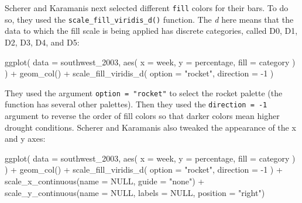 \documentclass[
]{book}
\newenvironment{Shaded}{\begin{snugshade}}{\end{snugshade}}
\newcommand{\AttributeTok}[1]{\textcolor[rgb]{0.77,0.63,0.00}{#1}}
\newcommand{\ConstantTok}[1]{\textcolor[rgb]{0.00,0.00,0.00}{#1}}
\newcommand{\DecValTok}[1]{\textcolor[rgb]{0.00,0.00,0.81}{#1}}
\newcommand{\FunctionTok}[1]{\textcolor[rgb]{0.00,0.00,0.00}{#1}}
\newcommand{\NormalTok}[1]{#1}
\newcommand{\SpecialCharTok}[1]{\textcolor[rgb]{0.00,0.00,0.00}{#1}}
\newcommand{\StringTok}[1]{\textcolor[rgb]{0.31,0.60,0.02}{#1}}
\begin{document}
Scherer and Karamanis next selected different \texttt{fill} colors for their bars. To do so, they used the \texttt{scale\_fill\_viridis\_d()} function. The \emph{d} here means that the data to which the fill scale is being applied has discrete categories, called D0, D1, D2, D3, D4, and D5:

\begin{Shaded}
\begin{Highlighting}[]
\FunctionTok{ggplot}\NormalTok{(}
  \AttributeTok{data =}\NormalTok{ southwest\_2003,}
  \FunctionTok{aes}\NormalTok{(}
    \AttributeTok{x =}\NormalTok{ week,}
    \AttributeTok{y =}\NormalTok{ percentage,}
    \AttributeTok{fill =}\NormalTok{ category}
\NormalTok{  )}
\NormalTok{) }\SpecialCharTok{+}
  \FunctionTok{geom\_col}\NormalTok{() }\SpecialCharTok{+}
  \FunctionTok{scale\_fill\_viridis\_d}\NormalTok{(}
    \AttributeTok{option =} \StringTok{"rocket"}\NormalTok{,}
    \AttributeTok{direction =} \SpecialCharTok{{-}}\DecValTok{1}
\NormalTok{  )}
\end{Highlighting}
\end{Shaded}

They used the argument \texttt{option\ =\ "rocket"} to select the rocket palette (the function has several other palettes). Then they used the \texttt{direction\ =\ -1} argument to reverse the order of fill colors so that darker colors mean higher drought conditions.
Scherer and Karamanis also tweaked the appearance of the x and y axes:

\begin{Shaded}
\begin{Highlighting}[]
\FunctionTok{ggplot}\NormalTok{(}
  \AttributeTok{data =}\NormalTok{ southwest\_2003,}
  \FunctionTok{aes}\NormalTok{(}
    \AttributeTok{x =}\NormalTok{ week,}
    \AttributeTok{y =}\NormalTok{ percentage,}
    \AttributeTok{fill =}\NormalTok{ category}
\NormalTok{  )}
\NormalTok{) }\SpecialCharTok{+}
  \FunctionTok{geom\_col}\NormalTok{() }\SpecialCharTok{+}
  \FunctionTok{scale\_fill\_viridis\_d}\NormalTok{(}
    \AttributeTok{option =} \StringTok{"rocket"}\NormalTok{,}
    \AttributeTok{direction =} \SpecialCharTok{{-}}\DecValTok{1}
\NormalTok{  ) }\SpecialCharTok{+}
  \FunctionTok{scale\_x\_continuous}\NormalTok{(}\AttributeTok{name =} \ConstantTok{NULL}\NormalTok{, }
                     \AttributeTok{guide =} \StringTok{"none"}\NormalTok{) }\SpecialCharTok{+}
  \FunctionTok{scale\_y\_continuous}\NormalTok{(}\AttributeTok{name =} \ConstantTok{NULL}\NormalTok{, }
                     \AttributeTok{labels =} \ConstantTok{NULL}\NormalTok{, }
                     \AttributeTok{position =} \StringTok{"right"}\NormalTok{)}
\end{Highlighting}
\end{Shaded}
\end{document}
